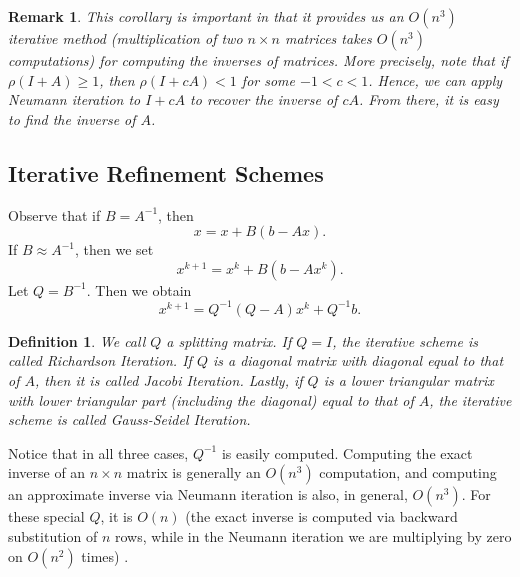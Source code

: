 \documentclass[12pt,reqno]{amsart}
\numberwithin{equation}{section}  %
\newtheorem{definition}[theorem]{Definition}
\newtheorem{remark}[theorem]{Remark}
\begin{document}
\begin{remark}
This corollary is important in that it provides us  an $O(n^3)$ iterative method
(multiplication of two $n \times n$ matrices takes $O(n^3)$ computations) for
computing the inverses of matrices. More precisely, note that if $\rho(I + A)
\ge 1$, then $\rho(I + cA) < 1$ for some $-1 < c < 1$. Hence, we can apply
Neumann iteration to $I + cA$ to recover the inverse of $cA$. From there, it is
easy to find the inverse of $A$.
\end{remark}

\subsection{Iterative Refinement Schemes}
Observe that if $B = A^{-1}$, then
\begin{equation*}
x = x + B(b - Ax).
\end{equation*}
If $B \approx A^{-1}$, then we set
\begin{equation*}
x^{k+1} = x^{k} + B(b - Ax^{k}).
\end{equation*}
Let $Q = B^{-1}$. Then we obtain
\begin{equation*}
x^{k+1} = Q^{-1}(Q - A)x^{k} + Q^{-1}b.
\end{equation*}
\begin{definition}
We call $Q$ a \emph{splitting} matrix. If $Q = I$, the iterative scheme is
called \emph{Richardson Iteration}. If $Q$ is a diagonal matrix with diagonal
equal to that of $A$, then it is called \emph{Jacobi Iteration}. Lastly, if $Q$
is a lower triangular matrix with lower triangular part (including the diagonal)
equal to that of $A$, the iterative scheme is called \emph{Gauss-Seidel
Iteration}.
\end{definition}
Notice that in all three cases, $Q^{-1}$ is easily computed. Computing the exact inverse
of an $n \times n$ matrix is generally an $O(n^3)$ computation, and computing
an approximate inverse via Neumann iteration is also, in general, $O(n^3)$. For these special $Q$, 
it is $O(n)$ (the exact inverse is computed via backward substitution of $n$ rows, while in the
Neumann iteration we are multiplying by zero on $O(n^2)$ times) .
\end{document}
